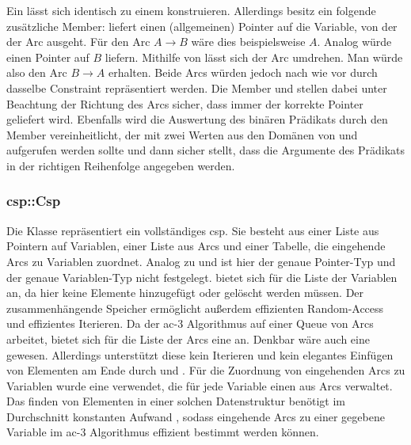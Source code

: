 Ein  lässt sich identisch zu einem  konstruieren. Allerdings besitz ein  folgende zusätzliche Member: 
liefert einen (allgemeinen) Pointer auf die Variable, von der der Arc ausgeht. Für den Arc $A \rightarrow B$ wäre dies beispielsweise $A$. Analog würde  einen
Pointer auf $B$ liefern. Mithilfe von  lässt sich der Arc umdrehen. Man würde also den Arc $B \rightarrow A$ erhalten. Beide Arcs würden jedoch nach wie vor
durch dasselbe Constraint repräsentiert werden. Die Member  und  stellen dabei unter Beachtung der Richtung des Arcs sicher, dass immer der korrekte
Pointer geliefert wird. Ebenfalls wird die Auswertung des binären Prädikats durch den Member  vereinheitlicht, der mit zwei Werten aus den Domänen
von  und  aufgerufen werden sollte und dann sicher stellt, dass die Argumente des Prädikats in der richtigen Reihenfolge angegeben werden.

\subsubsection{csp::Csp}
Die Klasse  repräsentiert ein vollständiges \ac*{csp}. Sie besteht aus einer Liste aus Pointern auf Variablen, einer Liste aus Arcs und einer Tabelle, die
eingehende Arcs zu Variablen zuordnet. Analog zu  und  ist hier der genaue Pointer-Typ und der genaue Variablen-Typ nicht festgelegt.
 bietet sich für die Liste der Variablen an, da hier keine Elemente hinzugefügt oder gelöscht werden müssen. Der zusammenhängende Speicher ermöglicht außerdem
effizienten Random-Access und effizientes Iterieren. Da der \ac*{ac}-3 Algorithmus auf einer Queue von Arcs arbeitet, bietet sich für die Liste der Arcs eine 
an. Denkbar wäre auch eine  gewesen. Allerdings unterstützt diese kein Iterieren und kein elegantes Einfügen von Elementen am Ende durch
 und . Für die Zuordnung von eingehenden Arcs zu Variablen wurde eine  verwendet, die für jede Variable
einen  aus Arcs verwaltet. Das finden von Elementen in einer solchen Datenstruktur benötigt im Durchschnitt konstanten Aufwand \cite{uMap}, sodass eingehende
Arcs zu einer gegebene Variable im \ac*{ac}-3 Algorithmus effizient bestimmt werden können.

